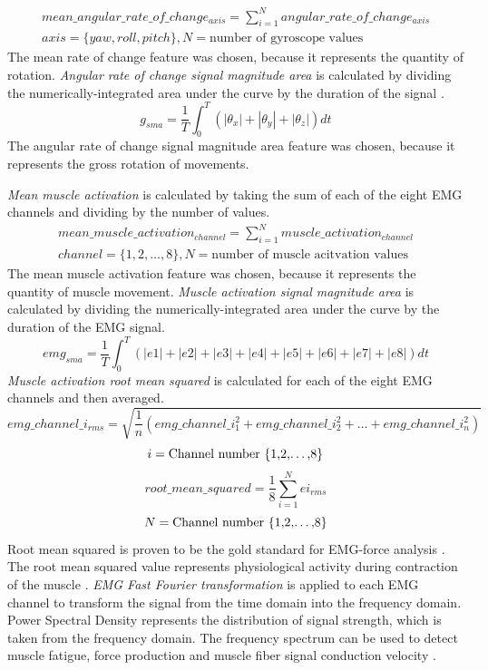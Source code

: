 \begin{align*}
mean\_angular\_rate\_of\_change_{axis} = \sum_{i=1}^{N}angular\_rate\_of\_change_{axis}\\
axis = \{yaw,roll,pitch\}, N = \text{number of gyroscope values}
\end{align*}
The mean rate of change feature was chosen, because it represents the quantity of rotation. \emph{Angular rate of change signal magnitude area} is calculated by dividing the numerically-integrated area under the curve by the duration of the signal \cite{Totty2017}.
$$ g_{sma} = \frac{1}{T}\int_{0}^{T}(|\theta_x|+|\theta_y|+|\theta_z|)dt$$
The angular rate of change signal magnitude area feature was chosen, because it represents the gross rotation of movements.
\par \emph{Mean muscle activation} is calculated by taking the sum of each of the eight EMG channels and dividing by the number of values.
\begin{align*}
mean\_muscle\_activation_{channel} = \sum_{i=1}^{N}muscle\_activation_{channel}\\
channel = \{1,2,\dots,8\}, N = \text{number of muscle acitvation values}
\end{align*}
The mean muscle activation feature was chosen, because it represents the quantity of muscle movement.
\emph{Muscle activation signal magnitude area} is calculated by dividing the numerically-integrated area under the curve by the duration of the EMG signal.
$$ emg_{sma} = \frac{1}{T}\int_{0}^{T}(|e1|+|e2|+|e3|+|e4|+|e5|+|e6|+|e7|+|e8|)dt$$
\emph{Muscle activation root mean squared} is calculated for each of the eight EMG channels and then averaged.
$$ emg\_channel\_i_{rms} = \sqrt{\frac{1}{n}(emg\_channel\_i_1^2+emg\_channel\_i_2^2+\dots+emg\_channel\_i_n^2)} $$
$$ i = \text{Channel number \{1,2,\dots,8\}} $$
$$ root\_mean\_squared = \frac{1}{8}\sum_{i=1}^{N}ei_{rms} $$
$$ N = \text{Channel number \{1,2,\dots,8\}} $$
Root mean squared is proven to be the gold standard for EMG-force analysis \cite{KALLENBERG2008780}. The root mean squared value represents physiological activity during contraction of the muscle \cite{Totty2017}.
\emph{EMG Fast Fourier transformation} is applied to each EMG channel to transform the signal from the time domain into the frequency domain. Power Spectral Density represents the distribution of signal strength, which is taken from the frequency domain. The frequency spectrum can be used to detect muscle fatigue, force production and muscle fiber signal conduction velocity \cite{Gler2005}.
